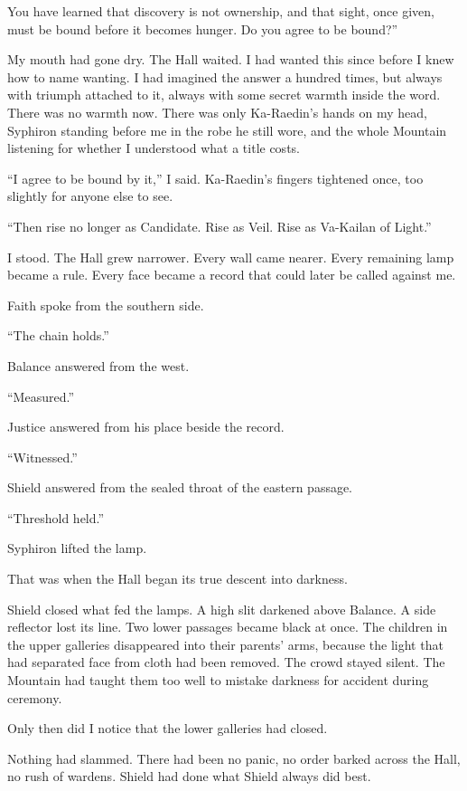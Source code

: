 You have learned that discovery is not ownership, and that sight, once given, must be bound before it becomes hunger.
Do you agree to be bound?''\par
My mouth had gone dry.
The Hall waited.
I had wanted this since before I knew how to name wanting.
I had imagined the answer a hundred times, but always with triumph attached to it, always with some secret warmth inside the word.
There was no warmth now.
There was only Ka-Raedin's hands on my head, Syphiron standing before me in the robe he still wore, and the whole Mountain listening for whether I understood what a title costs.\par
``I agree to be bound by it,'' I said.
Ka-Raedin's fingers tightened once, too slightly for anyone else to see.\par
``Then rise no longer as Candidate.
Rise as Veil.
Rise as Va-Kailan of Light.''\par
I stood.
The Hall grew narrower.
Every wall came nearer.
Every remaining lamp became a rule.
Every face became a record that could later be called against me.\par
Faith spoke from the southern side.\par
``The chain holds.''\par
Balance answered from the west.\par
``Measured.''\par
Justice answered from his place beside the record.\par
``Witnessed.''\par
Shield answered from the sealed throat of the eastern passage.\par
``Threshold held.''\par
Syphiron lifted the lamp.\par
That was when the Hall began its true descent into darkness.\par
Shield closed what fed the lamps.
A high slit darkened above Balance.
A side reflector lost its line.
Two lower passages became black at once.
The children in the upper galleries disappeared into their parents' arms, because the light that had separated face from cloth had been removed.
The crowd stayed silent.
The Mountain had taught them too well to mistake darkness for accident during ceremony.\par
Only then did I notice that the lower galleries had closed.\par
Nothing had slammed.
There had been no panic, no order barked across the Hall, no rush of wardens.
Shield had done what Shield always did best.
